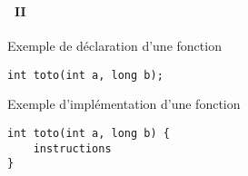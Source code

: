 \begin{frame}[containsverbatim]
  \frametitle{\secname}
  \framesubtitle{\subsecname~II}

  \begin{exampleblock}{Exemple de déclaration d'une fonction}
    \begin{verbatim}
int toto(int a, long b);
    \end{verbatim}
  \end{exampleblock}

  \begin{exampleblock}{Exemple d'implémentation d'une fonction}
    \begin{verbatim}
int toto(int a, long b) {
    instructions
}
    \end{verbatim}
  \end{exampleblock}

\end{frame}

